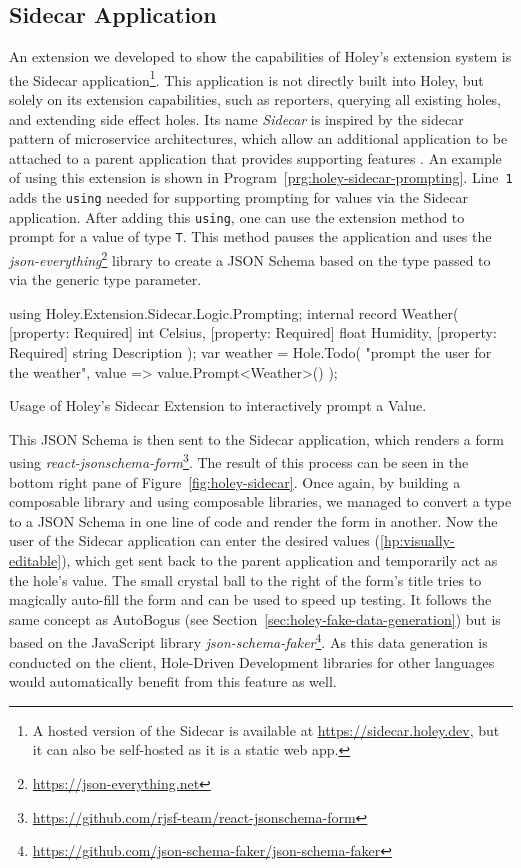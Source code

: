 \subsection{Sidecar Application}
\label{sec:holey-sidecar}
An extension we developed to show the capabilities of Holey's extension system is the Sidecar application\footnote{A hosted version of the Sidecar is available at \url{https://sidecar.holey.dev}, but it can also be self-hosted as it is a static web app.}.
This application is not directly built into Holey, but solely on its extension capabilities, such as reporters, querying all existing holes, and extending side effect holes.
Its name \emph{Sidecar} is inspired by the sidecar pattern of microservice architectures, which allow an additional application to be attached to a parent application that provides supporting features \cite{microsoft_sidecar_nodate}.
An example of using this extension is shown in Program~\ref{prg:holey-sidecar-prompting}.
Line~\verb|1| adds the \verb|using| needed for supporting prompting for values via the Sidecar application.
After adding this \verb|using|, one can use the extension method \texttt{} to prompt for a value of type \verb|T|.
This method pauses the application and uses the \emph{json-everything}\footnote{\url{https://json-everything.net}} library to create a JSON Schema based on the type passed to \texttt{} via the generic type parameter.
%
\begin{program}[ht]
\begin{CsCode}
using Holey.Extension.Sidecar.Logic.Prompting;
internal record Weather(
	[property: Required] int Celsius,
	[property: Required] float Humidity,
	[property: Required] string Description
);
var weather = Hole.Todo(
	"prompt the user for the weather",
	value => value.Prompt<Weather>()
);
\end{CsCode}
\caption{Usage of Holey's Sidecar Extension to interactively prompt a Value.}
\label{prg:holey-sidecar-prompting}
\end{program}
%
This JSON Schema is then sent to the Sidecar application, which renders a form using \emph{react-jsonschema-form}\footnote{\url{https://github.com/rjsf-team/react-jsonschema-form}}.
The result of this process can be seen in the bottom right pane of Figure~\ref{fig:holey-sidecar}.
Once again, by building a composable library and using composable libraries, we managed to convert a type to a JSON Schema in one line of code and render the form in another.
Now the user of the Sidecar application can enter the desired values (\ref{hp:visually-editable}), which get sent back to the parent application and temporarily act as the hole's value.
The small crystal ball to the right of the form's title tries to magically auto-fill the form and can be used to speed up testing.
It follows the same concept as AutoBogus (see Section~\ref{sec:holey-fake-data-generation}) but is based on the JavaScript library \emph{json-schema-faker}\footnote{\url{https://github.com/json-schema-faker/json-schema-faker}}.
As this data generation is conducted on the client, Hole-Driven Development libraries for other languages would automatically benefit from this feature as well.

